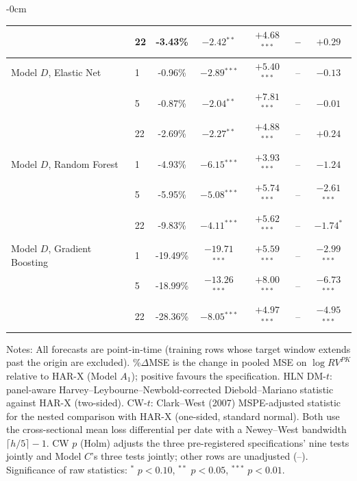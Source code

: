 \begin{table}[htbp]
\begin{adjustwidth}{-\extralength}{0cm}
\begin{tabular}{llccccc}
 & 22 & -3.43\% & $-2.42$$^{**}$ & $+4.68$$^{***}$ & -- & $+0.29$ \\
\midrule
Model $D$, Elastic Net & 1 & -0.96\% & $-2.89$$^{***}$ & $+5.40$$^{***}$ & -- & $-0.13$ \\
 & 5 & -0.87\% & $-2.04$$^{**}$ & $+7.81$$^{***}$ & -- & $-0.01$ \\
 & 22 & -2.69\% & $-2.27$$^{**}$ & $+4.88$$^{***}$ & -- & $+0.24$ \\
\midrule
Model $D$, Random Forest & 1 & -4.93\% & $-6.15$$^{***}$ & $+3.93$$^{***}$ & -- & $-1.24$ \\
 & 5 & -5.95\% & $-5.08$$^{***}$ & $+5.74$$^{***}$ & -- & $-2.61$$^{***}$ \\
 & 22 & -9.83\% & $-4.11$$^{***}$ & $+5.62$$^{***}$ & -- & $-1.74$$^{*}$ \\
\midrule
Model $D$, Gradient Boosting & 1 & -19.49\% & $-19.71$$^{***}$ & $+5.59$$^{***}$ & -- & $-2.99$$^{***}$ \\
 & 5 & -18.99\% & $-13.26$$^{***}$ & $+8.00$$^{***}$ & -- & $-6.73$$^{***}$ \\
 & 22 & -28.36\% & $-8.05$$^{***}$ & $+4.97$$^{***}$ & -- & $-4.95$$^{***}$ \\
\midrule
\bottomrule
\end{tabular}
\begin{tablenotes}\small
\item Notes: All forecasts are point-in-time (training rows whose target window extends past the origin are excluded). \%$\Delta$MSE is the change in pooled MSE on $\log RV^{PK}$ relative to HAR-X (Model $A_1$); positive favours the specification. HLN DM-$t$: panel-aware Harvey--Leybourne--Newbold-corrected Diebold--Mariano statistic against HAR-X (two-sided). CW-$t$: Clark--West (2007) MSPE-adjusted statistic for the nested comparison with HAR-X (one-sided, standard normal). Both use the cross-sectional mean loss differential per date with a Newey--West bandwidth $\lceil h/5\rceil-1$. CW $p$ (Holm) adjusts the three pre-registered specifications' nine tests jointly and Model $C$'s three tests jointly; other rows are unadjusted (--). Significance of raw statistics: $^{*}$ $p<0.10$, $^{**}$ $p<0.05$, $^{***}$ $p<0.01$.
\end{tablenotes}
\end{adjustwidth}
\end{table}
